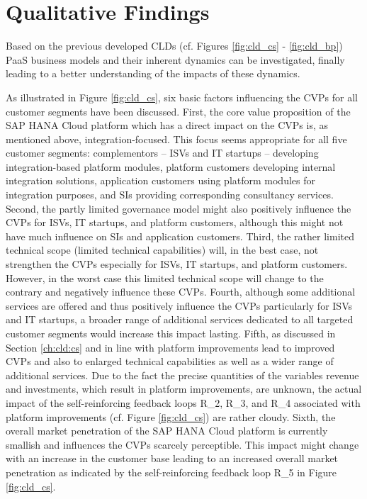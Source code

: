 \section{Qualitative Findings}\label{ch:poc:qf}

Based on the previous developed \acp{CLD} (cf. Figures \ref{fig:cld_cs} - \ref{fig:cld_bp}) \ac{PaaS} business models and their inherent dynamics can be investigated, finally leading to a better understanding of the impacts of these dynamics.

As illustrated in Figure \ref{fig:cld_cs}, six basic factors influencing the \acp{CVP} for all customer segments have been discussed. First, the core value proposition of the SAP HANA Cloud platform which has a direct impact on the \acp{CVP} is, as mentioned above, integration-focused. This focus seems appropriate for all five customer segments: complementors -- \acp{ISV} and \ac{IT} startups -- developing integration-based platform modules, platform customers developing internal integration solutions, application customers using platform modules for integration purposes, and \acp{SI} providing corresponding consultancy services. Second, the partly limited governance model might also positively influence the \acp{CVP} for \acp{ISV}, \ac{IT} startups, and platform customers, although this might not have much influence on \acp{SI} and application customers. Third, the rather limited technical scope (limited technical capabilities) will, in the best case, not strengthen the \acp{CVP} especially for \acp{ISV}, \ac{IT} startups, and platform customers. However, in the worst case this limited technical scope will change to the contrary and negatively influence these \acp{CVP}. Fourth, although some additional services are offered and thus positively influence the \acp{CVP} particularly for \acp{ISV} and \ac{IT} startups, a broader range of additional services dedicated to all targeted customer segments would increase this impact lasting. Fifth, as discussed in Section \ref {ch:cld:cs} and in line with \citet[p. 200]{Evans2003} platform improvements lead to improved \acp{CVP} and also to enlarged technical capabilities as well as a wider range of additional services. Due to the fact the precise quantities of the variables revenue and investments, which result in platform improvements, are unknown, the actual impact of the self-reinforcing feedback loops R\_2, R\_3, and R\_4 associated with platform improvements (cf. Figure \ref{fig:cld_cs}) are rather cloudy. Sixth, the overall market penetration of the SAP HANA Cloud platform is currently smallish and influences the \acp{CVP} scarcely perceptible. This impact might change with an increase in the customer base leading to an increased overall market penetration as indicated by the self-reinforcing feedback loop R\_5 in Figure \ref{fig:cld_cs}.

